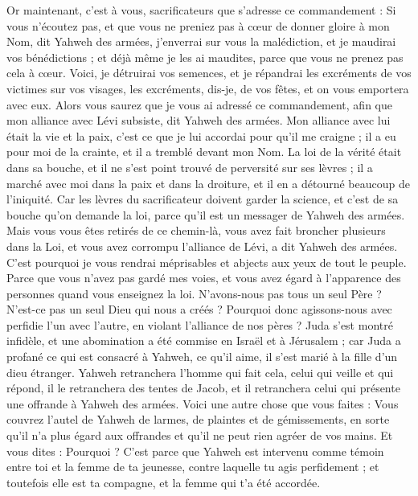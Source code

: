 \begin{multicols}{2}
\VerseOne{}Or maintenant, c'est à vous, sacrificateurs que s'adresse ce commandement :
Si vous n'écoutez pas, et que vous ne preniez pas à cœur de donner gloire à mon Nom, dit Yahweh des armées, j'enverrai sur vous la malédiction, et je maudirai vos bénédictions ; et déjà même je les ai maudites, parce que vous ne prenez pas cela à cœur.
Voici, je détruirai vos semences, et je répandrai les excréments de vos victimes sur vos visages, les excréments, dis-je, de vos fêtes, et on vous emportera avec eux.
Alors vous saurez que je vous ai adressé ce commandement, afin que mon alliance avec Lévi subsiste, dit Yahweh des armées.
Mon alliance avec lui était la vie et la paix, c'est ce que je lui accordai pour qu'il me craigne ; il a eu pour moi de la crainte, et il a tremblé devant mon Nom.
La loi de la vérité était dans sa bouche, et il ne s'est point trouvé de perversité sur ses lèvres ; il a marché avec moi dans la paix et dans la droiture, et il en a détourné beaucoup de l'iniquité.
Car les lèvres du sacrificateur doivent garder la science, et c'est de sa bouche qu'on demande la loi, parce qu'il est un messager de Yahweh des armées.
Mais vous vous êtes retirés de ce chemin-là, vous avez fait broncher plusieurs dans la Loi, et vous avez corrompu l'alliance de Lévi, a dit Yahweh des armées.
C'est pourquoi je vous rendrai méprisables et abjects aux yeux de tout le peuple. Parce que vous n'avez pas gardé mes voies, et vous avez égard à l'apparence des personnes quand vous enseignez la loi.
N'avons-nous pas tous un seul Père ? N'est-ce pas un seul Dieu qui nous a créés ? Pourquoi donc agissons-nous avec perfidie l'un avec l'autre, en violant l'alliance de nos pères ?
Juda s'est montré infidèle, et une abomination a été commise en Israël et à Jérusalem ; car Juda a profané ce qui est consacré à Yahweh, ce qu'il aime, il s'est marié à la fille d'un dieu étranger.
Yahweh retranchera l'homme qui fait cela, celui qui veille et qui répond, il le retranchera des tentes de Jacob, et il retranchera celui qui présente une offrande à Yahweh des armées.
Voici une autre chose que vous faites : Vous couvrez l'autel de Yahweh de larmes, de plaintes et de gémissements, en sorte qu'il n'a plus égard aux offrandes et qu'il ne peut rien agréer de vos mains.
Et vous dites : Pourquoi ? C'est parce que Yahweh est intervenu comme témoin entre toi et la femme de ta jeunesse, contre laquelle tu agis perfidement ; et toutefois elle est ta compagne, et la femme qui t'a été accordée.

\end{multicols}
